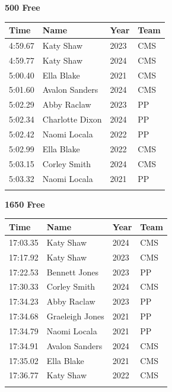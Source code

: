\vspace{1.2em}
\noindent\begin{minipage}[t]{0.98\textwidth}
\centering
\textbf{\textcolor{teamprimary}{500 Free}}\par
\vspace{0.5em}
\centering
\small
\renewcommand{\arraystretch}{1.0}
\setlength{\tabcolsep}{4pt}
\begin{tabular}{@{}p{2.5cm}p{4.5cm}p{1.5cm}p{2.5cm}@{}}
\toprule
\textbf{Time} & \textbf{Name} & \textbf{Year} & \textbf{Team} \\
\midrule
4:59.67 & Katy Shaw & 2023 & CMS \\
4:59.77 & Katy Shaw & 2024 & CMS \\
5:00.40 & Ella Blake & 2021 & CMS \\
5:01.60 & Avalon Sanders & 2024 & CMS \\
5:02.29 & Abby Raclaw & 2023 & PP \\
5:02.34 & Charlotte Dixon & 2024 & PP \\
5:02.42 & Naomi Locala & 2022 & PP \\
5:02.99 & Ella Blake & 2022 & CMS \\
5:03.15 & Corley Smith & 2024 & CMS \\
5:03.32 & Naomi Locala & 2021 & PP \\
\bottomrule
\vspace{0.5em}
\end{tabular}
\end{minipage}
\vspace{1.2em}
\noindent\begin{minipage}[t]{0.98\textwidth}
\centering
\textbf{\textcolor{teamprimary}{1650 Free}}\par
\vspace{0.5em}
\centering
\small
\renewcommand{\arraystretch}{1.0}
\setlength{\tabcolsep}{4pt}
\begin{tabular}{@{}p{2.5cm}p{4.5cm}p{1.5cm}p{2.5cm}@{}}
\toprule
\textbf{Time} & \textbf{Name} & \textbf{Year} & \textbf{Team} \\
\midrule
17:03.35 & Katy Shaw & 2024 & CMS \\
17:17.92 & Katy Shaw & 2023 & CMS \\
17:22.53 & Bennett Jones & 2023 & PP \\
17:30.33 & Corley Smith & 2024 & CMS \\
17:34.23 & Abby Raclaw & 2023 & PP \\
17:34.68 & Graeleigh Jones & 2021 & PP \\
17:34.79 & Naomi Locala & 2021 & PP \\
17:34.91 & Avalon Sanders & 2024 & CMS \\
17:35.02 & Ella Blake & 2021 & CMS \\
17:36.77 & Katy Shaw & 2022 & CMS \\
\bottomrule
\vspace{0.5em}
\end{tabular}
\end{minipage}
